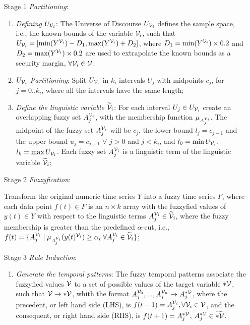 \begin{enumerate}
\item[Stage 1] \textit{Partitioning}:
\begin{enumerate}
\item \textit{Defining $U_{\mathcal{V}_i}$}: The Universe of Discourse $U_{\mathcal{V}_i}$ defines the sample space, i.e., the known bounds of the variable $\mathcal{V}_i$, such that $U_{\mathcal{V}_i} = [\min(Y^{\mathcal{V}_i})-D_1, \max(Y^{\mathcal{V}_i})+D_2]$, where $D_1 = \min(Y^{\mathcal{V}_i})\times 0.2$ and $D_2 = \max(Y^{\mathcal{V}_i})\times 0.2$ are used to extrapolate the known bounds as a security margin, $\forall \mathcal{V}_i \in \mathcal{V}$.

\item \textit{$U_{\mathcal{V}_i}$ Partitioning}: Split $U_{\mathcal{V}_i}$ in $k_i$ intervals $U_j$ with midpoints $c_j$, for $j=0..k_i$, where all the intervals have the same length;

\item \textit{Define the linguistic variable $\widetilde{\mathcal{V}}_i$}: For each interval $U_j \in U_{\mathcal{V}_i}$  create an overlapping fuzzy set $A_j^{\mathcal{V}_i}$, with the membership function $\mu_{A_j^{\mathcal{V}_i}}$. The midpoint of the fuzzy set $A_j^{\mathcal{V}_i}$ will be $c_j$, the lower bound $l_j = c_{j-1}$ and the upper bound $u_j = c_{j+1}$ $\forall$ $j >0$ and $j < k_i$, and $l_0 = \min U_{\mathcal{V}_i}$, $l_k = \max U_{\mathcal{V}_i}$. Each fuzzy set $A_j^{\mathcal{V}_i}$ is a linguistic term of the linguistic variable $\widetilde{\mathcal{V}}_i$;
\end{enumerate}

\item[Stage 2] \textit{Fuzzyfication}: 

Transform the original numeric time series $Y$ into a fuzzy time series $F$, where each data point $f(t) \in F$ is an $n \times k$ array with the fuzzyfied values of $y(t) \in Y$ with respect to the linguistic terms $A_j^{\mathcal{V}_i} \in \widetilde{\mathcal{V}}_i$, where the fuzzy membership is greater than the predefined $\alpha$-cut, i.e., $f(t) = \{A_j^{\mathcal{V}_i}\; |\; \mu_{A_j^{\mathcal{V}_i}}(y(t)^{\mathcal{V}_i}) \geq \alpha_i\;\forall A_j^{\mathcal{V}_i} \in \widetilde{\mathcal{V}}_i\}$;

\item[Stage 3] \textit{Rule Induction}: 
\begin{enumerate}
\item \textit{Generate the temporal patterns}: The fuzzy temporal patterns associate the fuzzyfied values $\mathcal{V}$ to a set of possible values of the target variable $*\mathcal{V}$, such that $\mathcal{V} \rightarrow *\mathcal{V}$, whith the format $A_j^{\mathcal{V}_0},...,A_j^{\mathcal{V}_n} \rightarrow A_j^{*\mathcal{V}}$, where the precedent, or left hand side (LHS), is $f(t - 1) = A_j^{\mathcal{V}_i}, \forall \mathcal{V}_i \in \mathcal{V}$, and the consequent, or right hand side (RHS), is $f(t+1) = A_j^{*\mathcal{V}}$, $A_j^{*\mathcal{V}} \in \widetilde{*\mathcal{V}}$.


\end{enumerate}
\end{enumerate}
